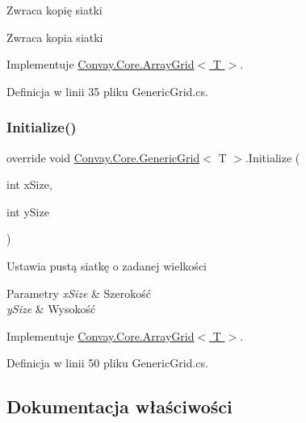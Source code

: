 Zwraca kopię siatki 

\begin{DoxyReturn}{Zwraca}
kopia siatki
\end{DoxyReturn}


Implementuje \hyperlink{class_convay_1_1_core_1_1_array_grid_a139eba7f8a6780b4ecbc446959e159ad}{Convay.\+Core.\+Array\+Grid$<$ T $>$}.



Definicja w linii 35 pliku Generic\+Grid.\+cs.

\hypertarget{class_convay_1_1_core_1_1_generic_grid_a5d39ff67bb67b6a70455ecd61fc1a0ef}{}\label{class_convay_1_1_core_1_1_generic_grid_a5d39ff67bb67b6a70455ecd61fc1a0ef} 
\subsubsection{\texorpdfstring{Initialize()}{Initialize()}}
{\footnotesize\ttfamily override void \hyperlink{class_convay_1_1_core_1_1_generic_grid}{Convay.\+Core.\+Generic\+Grid}$<$ T $>$.Initialize (\begin{DoxyParamCaption}\item[{int}]{x\+Size,  }\item[{int}]{y\+Size }\end{DoxyParamCaption})\hspace{0.3cm}{\ttfamily [virtual]}}



Ustawia pustą siatkę o zadanej wielkości 


\begin{DoxyParams}{Parametry}
{\em x\+Size} & Szerokość\\
\hline
{\em y\+Size} & Wysokość\\
\hline
\end{DoxyParams}


Implementuje \hyperlink{class_convay_1_1_core_1_1_array_grid_a49501f55af9f747ed75cb94563b6d641}{Convay.\+Core.\+Array\+Grid$<$ T $>$}.



Definicja w linii 50 pliku Generic\+Grid.\+cs.



\subsection{Dokumentacja właściwości}
\hypertarget{class_convay_1_1_core_1_1_generic_grid_aa87f9cbce32d294ecfd66a36e7b38152}{}\label{class_convay_1_1_core_1_1_generic_grid_aa87f9cbce32d294ecfd66a36e7b38152} 
